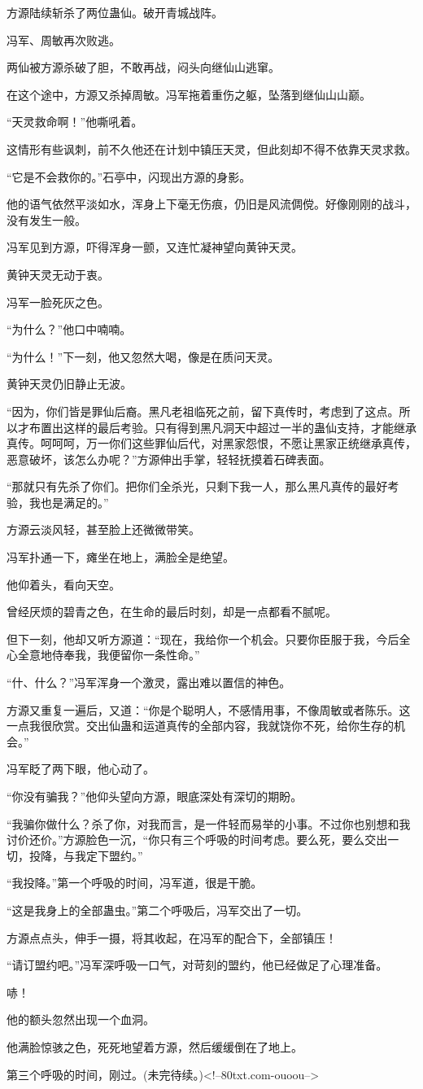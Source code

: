 \begin{this_body}
方源陆续斩杀了两位蛊仙。破开青城战阵。

冯军、周敏再次败逃。

两仙被方源杀破了胆，不敢再战，闷头向继仙山逃窜。

在这个途中，方源又杀掉周敏。冯军拖着重伤之躯，坠落到继仙山山巅。

“天灵救命啊！”他嘶吼着。

这情形有些讽刺，前不久他还在计划中镇压天灵，但此刻却不得不依靠天灵求救。

“它是不会救你的。”石亭中，闪现出方源的身影。

他的语气依然平淡如水，浑身上下毫无伤痕，仍旧是风流倜傥。好像刚刚的战斗，没有发生一般。

冯军见到方源，吓得浑身一颤，又连忙凝神望向黄钟天灵。

黄钟天灵无动于衷。

冯军一脸死灰之色。

“为什么？”他口中喃喃。

“为什么！”下一刻，他又忽然大喝，像是在质问天灵。

黄钟天灵仍旧静止无波。

“因为，你们皆是罪仙后裔。黑凡老祖临死之前，留下真传时，考虑到了这点。所以才布置出这样的最后考验。只有得到黑凡洞天中超过一半的蛊仙支持，才能继承真传。呵呵呵，万一你们这些罪仙后代，对黑家怨恨，不愿让黑家正统继承真传，恶意破坏，该怎么办呢？”方源伸出手掌，轻轻抚摸着石碑表面。

“那就只有先杀了你们。把你们全杀光，只剩下我一人，那么黑凡真传的最好考验，我也是满足的。”

方源云淡风轻，甚至脸上还微微带笑。

冯军扑通一下，瘫坐在地上，满脸全是绝望。

他仰着头，看向天空。

曾经厌烦的碧青之色，在生命的最后时刻，却是一点都看不腻呢。

但下一刻，他却又听方源道：“现在，我给你一个机会。只要你臣服于我，今后全心全意地侍奉我，我便留你一条性命。”

“什、什么？”冯军浑身一个激灵，露出难以置信的神色。

方源又重复一遍后，又道：“你是个聪明人，不感情用事，不像周敏或者陈乐。这一点我很欣赏。交出仙蛊和运道真传的全部内容，我就饶你不死，给你生存的机会。”

冯军眨了两下眼，他心动了。

“你没有骗我？”他仰头望向方源，眼底深处有深切的期盼。

“我骗你做什么？杀了你，对我而言，是一件轻而易举的小事。不过你也别想和我讨价还价。”方源脸色一沉，“你只有三个呼吸的时间考虑。要么死，要么交出一切，投降，与我定下盟约。”

“我投降。”第一个呼吸的时间，冯军道，很是干脆。

“这是我身上的全部蛊虫。”第二个呼吸后，冯军交出了一切。

方源点点头，伸手一摄，将其收起，在冯军的配合下，全部镇压！

“请订盟约吧。”冯军深呼吸一口气，对苛刻的盟约，他已经做足了心理准备。

哧！

他的额头忽然出现一个血洞。

他满脸惊骇之色，死死地望着方源，然后缓缓倒在了地上。

第三个呼吸的时间，刚过。(未完待续。)<!--80txt.com-ouoou-->

\end{this_body}

